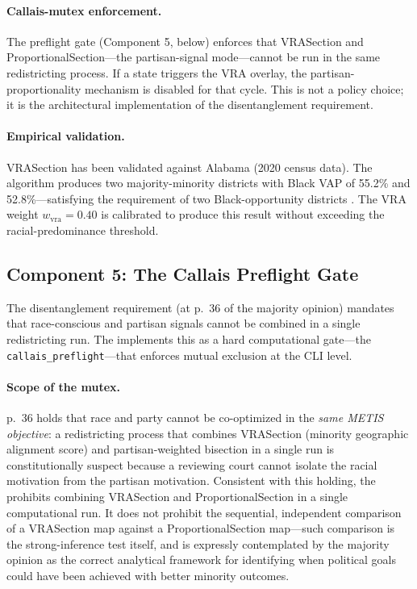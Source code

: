 \paragraph{Callais-mutex enforcement.}
The \callais{} preflight gate (Component 5, below) enforces that VRASection
and ProportionalSection---the partisan-signal mode---cannot be run in the
same redistricting process.
If a state triggers the VRA overlay, the partisan-proportionality mechanism
is disabled for that cycle.
This is not a policy choice; it is the architectural implementation of the
\callais{} disentanglement requirement.

\paragraph{Empirical validation.}
VRASection has been validated against Alabama (2020 census data).
The algorithm produces two majority-minority districts with Black VAP of
55.2\% and 52.8\%---satisfying the \allenmilligan{} requirement of two
Black-opportunity districts \citep{b14paper}.
The VRA weight $w_\text{vra} = 0.40$ is calibrated to produce this result
without exceeding the racial-predominance threshold.

\subsection{Component 5: The Callais Preflight Gate}

The \callais{} disentanglement requirement (at p.~36 of the majority opinion)
mandates that race-conscious and partisan signals cannot be combined in a
single redistricting run.
The \dia{} implements this as a hard computational gate---the
\texttt{callais\_preflight}---that enforces mutual exclusion at the CLI level.

\paragraph{Scope of the mutex.}
\callais{} p.~36 holds that race and party cannot be co-optimized in the
\emph{same METIS objective}: a redistricting process that combines
VRASection (minority geographic alignment score) and partisan-weighted bisection
in a single run is constitutionally suspect because a reviewing court cannot
isolate the racial motivation from the partisan motivation.
Consistent with this holding, the \dia{} prohibits combining VRASection and
ProportionalSection in a single computational run.
It does not prohibit the sequential, independent comparison of a VRASection
map against a ProportionalSection map---such comparison is the \callais{}
strong-inference test itself, and is expressly contemplated by the majority
opinion as the correct analytical framework for identifying when political goals
could have been achieved with better minority outcomes.

